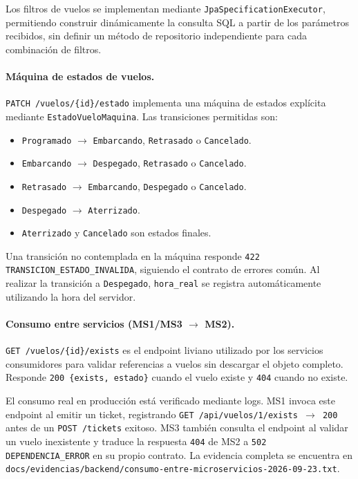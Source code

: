 Los filtros de vuelos se implementan mediante
\texttt{JpaSpecificationExecutor}, permitiendo construir dinámicamente
la consulta SQL a partir de los parámetros recibidos, sin definir un
método de repositorio independiente para cada combinación de filtros.

\paragraph{Máquina de estados de vuelos.}

\texttt{PATCH /vuelos/\{id\}/estado} implementa una máquina de estados
explícita mediante \texttt{EstadoVueloMaquina}. Las transiciones
permitidas son:

\begin{itemize}
  \item \texttt{Programado} $\to$ \texttt{Embarcando},
  \texttt{Retrasado} o \texttt{Cancelado}.
  \item \texttt{Embarcando} $\to$ \texttt{Despegado},
  \texttt{Retrasado} o \texttt{Cancelado}.
  \item \texttt{Retrasado} $\to$ \texttt{Embarcando},
  \texttt{Despegado} o \texttt{Cancelado}.
  \item \texttt{Despegado} $\to$ \texttt{Aterrizado}.
  \item \texttt{Aterrizado} y \texttt{Cancelado} son estados finales.
\end{itemize}

Una transición no contemplada en la máquina responde
\texttt{422 TRANSICION\_ESTADO\_INVALIDA}, siguiendo el contrato de
errores común. Al realizar la transición a \texttt{Despegado},
\texttt{hora\_real} se registra automáticamente utilizando la hora del
servidor.

\paragraph{Consumo entre servicios (MS1/MS3 $\to$ MS2).}

\texttt{GET /vuelos/\{id\}/exists} es el endpoint liviano utilizado por
los servicios consumidores para validar referencias a vuelos sin
descargar el objeto completo. Responde
\texttt{200 \{exists, estado\}} cuando el vuelo existe y
\texttt{404} cuando no existe.

El consumo real en producción está verificado mediante logs. MS1 invoca
este endpoint al emitir un ticket, registrando
\texttt{GET /api/vuelos/1/exists $\to$ 200} antes de un
\texttt{POST /tickets} exitoso. MS3 también consulta el endpoint al
validar un vuelo inexistente y traduce la respuesta \texttt{404} de MS2
a \texttt{502 DEPENDENCIA\_ERROR} en su propio contrato. La evidencia
completa se encuentra en
\texttt{docs/evidencias/backend/consumo-entre-microservicios-2026-09-23.txt}.

